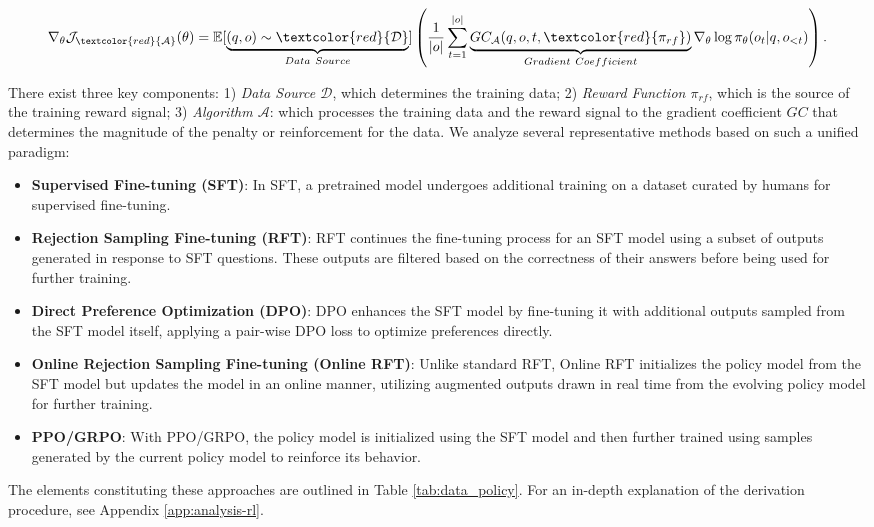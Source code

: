 \begin{itemize}[topsep=0pt]
\begin{itemize}[topsep=0pt]
\begin{equation}
    \nabla_{\theta}\mathcal{J}_{\textcolor{red}{\mathcal{A}}}(\theta) = \mathbb{E}[\underbrace{(q,o) \sim \textcolor{red}{\mathcal{D}}}_{Data \ Source}]\left( \frac{1}{|o|} \sum_{t=1}^{|o|}  \underbrace{GC_{{\mathcal{A}}}(q, o, t, \textcolor{red}{\pi_{{rf}}})}_{Gradient \ Coefficient}  \nabla_{\theta}\log \pi_{\theta}(o_t | q, o_{<t})\right).
\label{eq:objective}
\end{equation}

There exist three key components: 1) \textit{Data Source $\mathcal{D}$}, which determines the training data; 2) \textit{Reward Function $\pi_{{rf}}$}, which is the source of the training reward signal; 3) \textit{Algorithm $\mathcal{A}$}: which processes the training data and the reward signal to the gradient coefficient $GC$ that determines the magnitude of the penalty or reinforcement for the data. We analyze several representative methods based on such a unified paradigm:

\begin{itemize}
    \item  \textbf{Supervised Fine-tuning (SFT)}: In SFT, a pretrained model undergoes additional training on a dataset curated by humans for supervised fine-tuning.
    \item \textbf{Rejection Sampling Fine-tuning (RFT)}: RFT continues the fine-tuning process for an SFT model using a subset of outputs generated in response to SFT questions. These outputs are filtered based on the correctness of their answers before being used for further training.
    \item \textbf{Direct Preference Optimization (DPO)}: DPO enhances the SFT model by fine-tuning it with additional outputs sampled from the SFT model itself, applying a pair-wise DPO loss to optimize preferences directly.
    \item \textbf{Online Rejection Sampling Fine-tuning (Online RFT)}: Unlike standard RFT, Online RFT initializes the policy model from the SFT model but updates the model in an online manner, utilizing augmented outputs drawn in real time from the evolving policy model for further training.
    \item \textbf{PPO/GRPO}: With PPO/GRPO, the policy model is initialized using the SFT model and then further trained using samples generated by the current policy model to reinforce its behavior.
\end{itemize}

The elements constituting these approaches are outlined in Table \ref{tab:data_policy}. For an in-depth explanation of the derivation procedure, see Appendix \ref{app:analysis-rl}.


\end{itemize}
\end{itemize}
